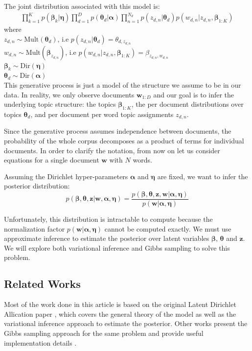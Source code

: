 \documentclass{article}
\begin{document}
The joint distribution associated with this model is:
{\small
\begin{multline} 
	\label{joint}
	\prod_{k=1}^{K} p(\bm{\beta}_k | \bm{\eta}) 
	\prod_{d=1}^{D} p(\bm{\theta}_d | \bm{\alpha})
	\prod_{n=1}^{N_d} p(z_{d,n} | \bm{\theta}_d) p(w_{d,n} | z_{d,n}, \bm{\beta}_{1:K})
\end{multline}
}
where \\
$z_{d,n} \sim \mathrm{Mult}(\bm{\theta}_d)$, i.e $p(z_{d,n} | \bm{\theta}_d) = \theta_{d, z_{d,n}}$ \\
$w_{d,n} \sim \mathrm{Mult}(\bm{\beta}_{z_{d,n}})$, i.e $p(w_{d,n} | z_{d,n}, \bm{\beta}_{1:K}) = \beta_{z_{d,n},w_{d,n}}$ \\
$\bm{\beta}_k \sim \mathrm{Dir}(\bm{\eta})$ \\
$\bm{\theta}_d \sim \mathrm{Dir}(\bm{\alpha})$ \\

This generative process is just a model of the structure we assume to be in our data. In reality, we only observe documents $\mathbf{w}_{1:D}$ and our goal is to infer the underlying topic structure: the topics $\bm{\beta}_{1:K}$, the per document distributions over topics $\bm{\theta}_{d}$, and per document per word topic assignments $z_{d, n}$. 

Since the generative process assumes independence between documents, the probability of the whole corpus decomposes as a product of terms for individual documents. In order to clarify the notation, from now on let us consider equations for a single document $\mathbf{w}$ with $N$ words.

Assuming the Dirichlet hyper-parameters $\bm{\alpha}$ and $\bm{\eta}$ are fixed, we want to infer the posterior distribution:
\begin{equation}\label{eq:posteriorLDA}
 p(\bm{\beta}, \bm{\theta}, \mathbf{z} | \mathbf{w}, \bm{\alpha}, \bm{\eta}) =
 \frac{p(\bm{\beta}, \bm{\theta}, \mathbf{z}, \mathbf{w} | \bm{\alpha}, \bm{\eta})}{p(\mathbf{w} | \bm{\alpha}, \bm{\eta})}
\end{equation}

Unfortunately, this distribution is intractable to compute because the normalization factor $p(\mathbf{w} | \bm{\alpha}, \bm{\eta})$ cannot be computed exactly. We must use approximate inference to estimate the posterior over latent variables $\bm{\beta}$, $\bm{\theta}$ and $\mathbf{z}$. We will explore both variational inference and Gibbs sampling to solve this problem.

\subsection{Related Works}
Most of the work done in this article is based on the original Latent Dirichlet Allication paper \cite{blei2003latent}, which covers the general theory of the model as well as the variational inference approach to estimate the posterior. Other works present the Gibbs sampling approach for the same problem and provide useful implementation details \cite{darling2011theoretical, griffiths2002gibbs, heinrich2005parameter}.
\end{document}
